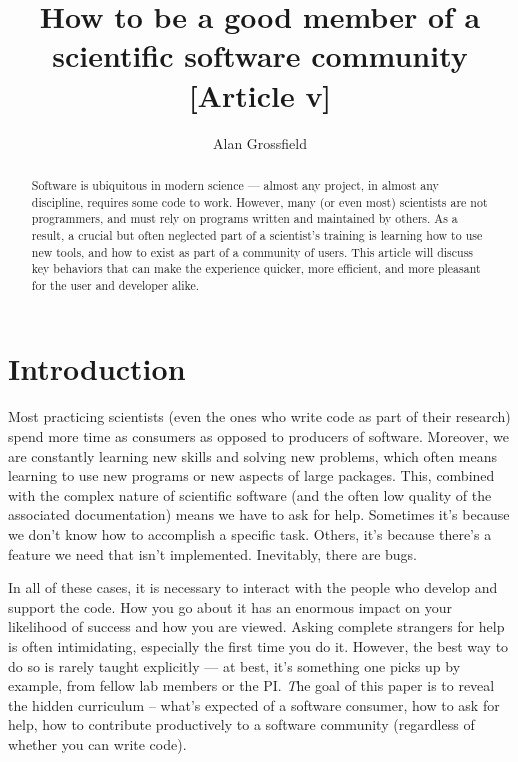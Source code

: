 \documentclass[9pt,training]{livecoms}
\title{How to be a good member of a scientific software community [Article v\versionnumber]}
\author[1*]{Alan Grossfield}
\affil[1]{University of Rochester Medical Center, Department of Biochemistry and Biophysics}
\begin{document}
\begin{frontmatter}
\maketitle

\begin{abstract}

Software is ubiquitous in modern science --- almost any project, in almost any
discipline, requires some code to work. However, many (or even most) scientists
are not programmers, and must rely on programs written and maintained by others.
As a result, a crucial but often neglected part of a scientist's training is
learning how to use new tools, and how to exist as part of a community of users.
This article will discuss key behaviors that can make the experience quicker,
more efficient, and more pleasant for the user and developer alike.


\end{abstract}

\end{frontmatter}




\section{Introduction}

Most practicing scientists (even the ones who write code as part of their
research) spend more time as consumers as opposed to producers of software.
Moreover, we are constantly learning new skills and solving new problems, which
often means learning to use new programs or new aspects of large packages. This,
combined with the complex nature of scientific software (and the often low
quality of the associated documentation) means we have to ask for help.
Sometimes it's because we don't know how to accomplish a specific task. Others,
it's because there's a feature we need that isn't implemented. Inevitably, there
are bugs.

In all of these cases, it is necessary to interact with the people who develop
and support the code. How you go about it has an enormous impact on your
likelihood of success and how you are viewed. Asking complete strangers for
help is often intimidating, especially the first time you do it. However, the
best way to do so is rarely taught explicitly --- at best, it's something one
picks up by example, from fellow lab members or the PI.  {\emph The goal of this
paper is to reveal the hidden curriculum -- what's expected of a software
consumer, how to ask for help, how to contribute productively to a software
community (regardless of whether you can write code).}
\end{document}
